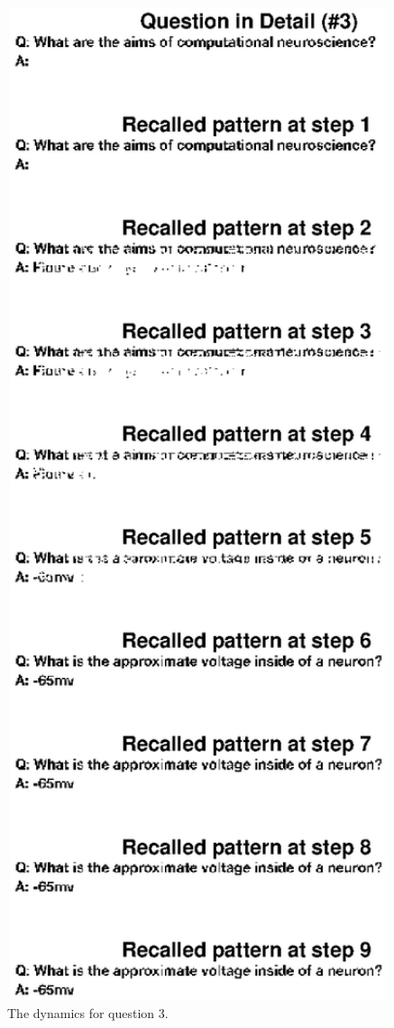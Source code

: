 \documentclass[11pt, oneside]{article}
\begin{document}
 \begin{figure}[H]
  \includegraphics[width=1\textwidth]{q3detail.eps}
  \caption{The dynamics for question 3.}
  \label{fig:q3detail}
  \end{figure}
\end{document}
